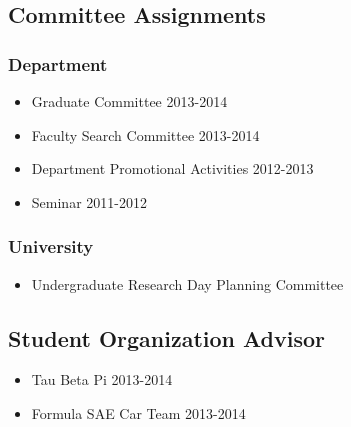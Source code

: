 \subsection*{Committee Assignments}
\subsubsection*{Department}
\begin{itemize}
\item Graduate Committee 2013-2014
\item Faculty Search Committee 2013-2014
\item Department Promotional Activities 2012-2013
\item Seminar 2011-2012
\end{itemize}

\subsubsection*{University}
\begin{itemize}
\item Undergraduate Research Day Planning Committee
\end{itemize}

\subsection*{Student Organization Advisor}
\begin{itemize}
\item Tau Beta Pi 2013-2014
\item Formula SAE Car Team 2013-2014
\end{itemize}



